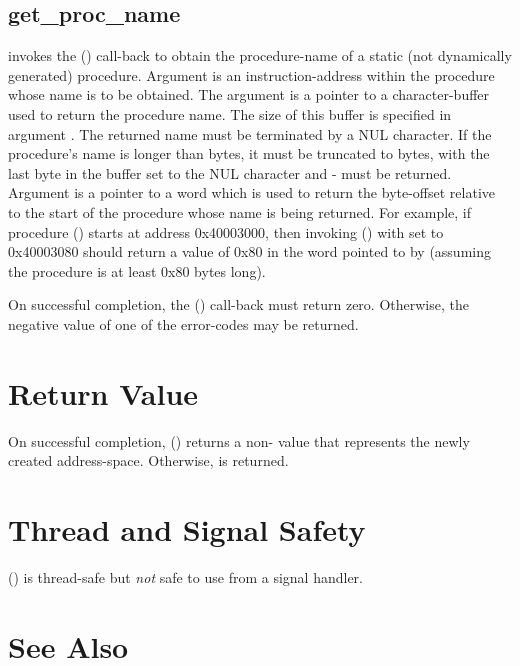 \documentclass{article}
\begin{document}
\subsection{get\_proc\_name}

 invokes the () call-back to
obtain the procedure-name of a static (not dynamically generated)
procedure.  Argument  is an instruction-address within the
procedure whose name is to be obtained.  The  argument is a
pointer to a character-buffer used to return the procedure name.  The
size of this buffer is specified in argument .  The
returned name must be terminated by a NUL character.  If the
procedure's name is longer than  bytes, it must be
truncated to  bytes, with the last byte in the
buffer set to the NUL character and - must be
returned.  Argument  is a pointer to a word which is used to
return the byte-offset relative to the start of the procedure whose
name is being returned.  For example, if procedure () starts
at address 0x40003000, then invoking () with
 set to 0x40003080 should return a value of 0x80 in the word
pointed to by  (assuming the procedure is at least 0x80
bytes long).

On successful completion, the () call-back must
return zero.  Otherwise, the negative value of one of the
 error-codes may be returned.


\section{Return Value}

On successful completion, () returns a
non- value that represents the newly created
address-space.  Otherwise,  is returned.

\section{Thread and Signal Safety}

() is thread-safe but \emph{not}
safe to use from a signal handler.

\section{See Also}
\end{document}
